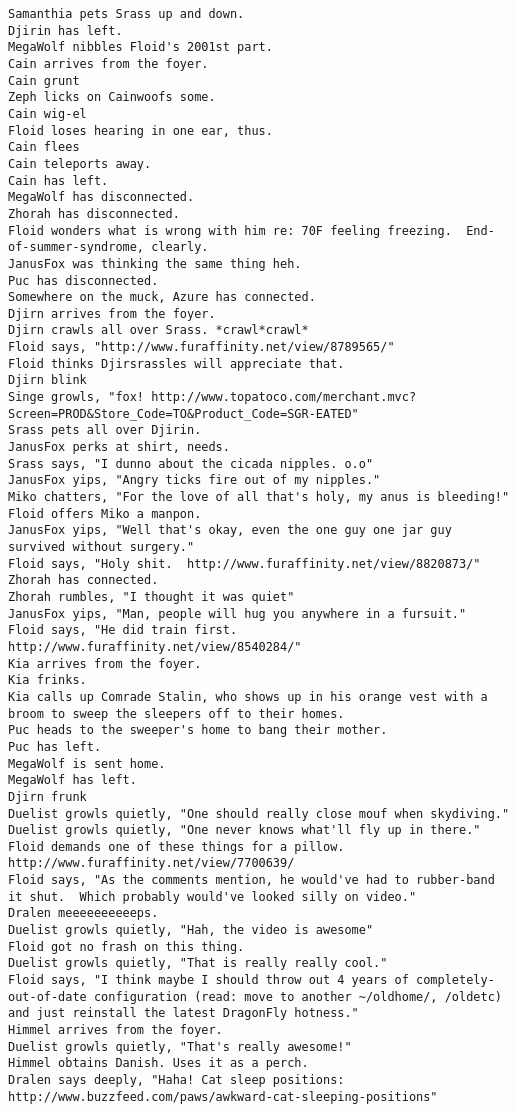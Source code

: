 \begin{verbatim}
Samanthia pets Srass up and down.
Djirin has left.
MegaWolf nibbles Floid's 2001st part.
Cain arrives from the foyer.
Cain grunt
Zeph licks on Cainwoofs some.
Cain wig-el
Floid loses hearing in one ear, thus.
Cain flees
Cain teleports away.
Cain has left.
MegaWolf has disconnected.
Zhorah has disconnected.
Floid wonders what is wrong with him re: 70F feeling freezing.  End-of-summer-syndrome, clearly.
JanusFox was thinking the same thing heh.
Puc has disconnected.
Somewhere on the muck, Azure has connected.
Djirn arrives from the foyer.
Djirn crawls all over Srass. *crawl*crawl*
Floid says, "http://www.furaffinity.net/view/8789565/"
Floid thinks Djirsrassles will appreciate that.
Djirn blink
Singe growls, "fox! http://www.topatoco.com/merchant.mvc?Screen=PROD&Store_Code=TO&Product_Code=SGR-EATED"
Srass pets all over Djirin.
JanusFox perks at shirt, needs.
Srass says, "I dunno about the cicada nipples. o.o"
JanusFox yips, "Angry ticks fire out of my nipples."
Miko chatters, "For the love of all that's holy, my anus is bleeding!"
Floid offers Miko a manpon.
JanusFox yips, "Well that's okay, even the one guy one jar guy survived without surgery."
Floid says, "Holy shit.  http://www.furaffinity.net/view/8820873/"
Zhorah has connected.
Zhorah rumbles, "I thought it was quiet"
JanusFox yips, "Man, people will hug you anywhere in a fursuit."
Floid says, "He did train first.  http://www.furaffinity.net/view/8540284/"
Kia arrives from the foyer.
Kia frinks.
Kia calls up Comrade Stalin, who shows up in his orange vest with a broom to sweep the sleepers off to their homes.
Puc heads to the sweeper's home to bang their mother.
Puc has left.
MegaWolf is sent home.
MegaWolf has left.
Djirn frunk
Duelist growls quietly, "One should really close mouf when skydiving."
Duelist growls quietly, "One never knows what'll fly up in there."
Floid demands one of these things for a pillow.  http://www.furaffinity.net/view/7700639/
Floid says, "As the comments mention, he would've had to rubber-band it shut.  Which probably would've looked silly on video."
Dralen meeeeeeeeeeps.
Duelist growls quietly, "Hah, the video is awesome"
Floid got no frash on this thing.
Duelist growls quietly, "That is really really cool."
Floid says, "I think maybe I should throw out 4 years of completely-out-of-date configuration (read: move to another ~/oldhome/, /oldetc) and just reinstall the latest DragonFly hotness."
Himmel arrives from the foyer.
Duelist growls quietly, "That's really awesome!"
Himmel obtains Danish. Uses it as a perch.
Dralen says deeply, "Haha! Cat sleep positions: http://www.buzzfeed.com/paws/awkward-cat-sleeping-positions"

\end{verbatim}
